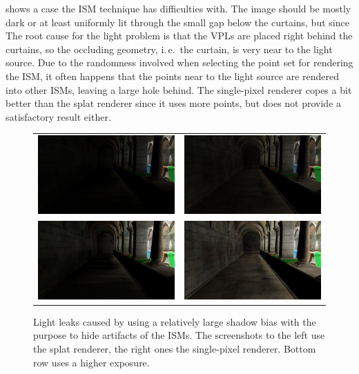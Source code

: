   shows a case the ISM technique has difficulties with. The image should be mostly dark or at least uniformly lit through the small gap below the curtains, but  since The root cause for the light problem is that the VPLs are placed right behind the curtains, so the occluding geometry, i.\,e.\ the curtain, is very near to the light source. Due to the randomness involved when selecting the point set for rendering the ISM, it often happens that the points near to the light source are rendered into other ISMs, leaving a large hole behind. The single-pixel renderer copes a bit better than the splat renderer since it uses more points, but does not provide a satisfactory result either.



 \begin{figure}[htb]
 \centering
   \begin{tabular}{@{}cc@{}}
     \includegraphics[width=.22\textwidth]{../screenshots/bias_splat} &
     \includegraphics[width=.22\textwidth]{../screenshots/bias_single_pixel}\\
       \includegraphics[width=.22\textwidth]{../screenshots/bias_splat_exposure} &
       \includegraphics[width=.22\textwidth]{../screenshots/bias_single_pixel_exposure}
   \end{tabular}
   \caption{Light leaks caused by using a relatively large shadow bias with the purpose to hide artifacts of the ISMs. The screenshots to the left use the splat renderer, the right ones the single-pixel renderer. Bottom row uses a higher exposure.}
   \label{fig:results:bias}
 \end{figure}

